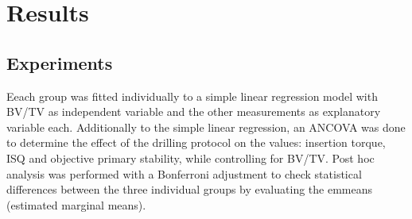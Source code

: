 \documentclass[12pt, a4paper, twoside]{report}
\begin{document}
\chapter{Results}
%
\section{Experiments}
%
Eeach group was fitted individually to a simple linear regression model with BV/TV as independent variable and the other measurements as explanatory variable each. Additionally to the simple linear regression, an ANCOVA was done to determine the effect of the drilling protocol on the values: insertion torque, ISQ and objective primary stability, while controlling for BV/TV. Post hoc analysis was performed with a Bonferroni adjustment to check statistical differences between the three individual groups by evaluating the emmeans (estimated marginal means).
%
\end{document}
